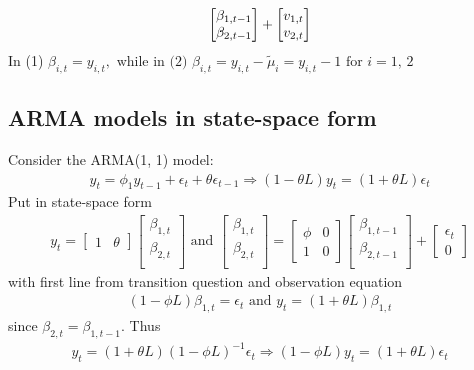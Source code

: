 \documentclass[10pt]{article}
\begin{document}
\begin{itemize}
\begin{gather}
        \begin{bmatrix}
            \beta_{1, t - 1}\\
            \beta_{2, t -1 }\\
        \end{bmatrix}
        +
        \begin{bmatrix}
            v_{1, t}\\
            v_{2, t}\\
        \end{bmatrix}\notag
    \end{gather}
    In (1) $\beta_{i, t} = y_{i, t}, \text{ while in (2) }\beta_{i, t} = y_{i, t} - \tilde{\mu}_i = y_{i, t} - 1 \text{ for }i = 1,\, 2 $
\end{itemize}
\newpage 
\subsection{ARMA models in state-space form}
Consider the ARMA(1, 1) model: 
\begin{gather*}
    y_t = \phi_1y_{t - 1} + \epsilon_t + \theta\epsilon_{t -1 }\Rightarrow (1 - \theta L)y_t = (1 + \theta L)\epsilon_t
\end{gather*}
Put in state-space form 
\begin{gather*}
    y_t = \begin{bmatrix}
        1 & \theta 
    \end{bmatrix}
    \begin{bmatrix}
        \beta_{1, t}\\
        \beta_{2, t}\\
    \end{bmatrix}
    \text{ and }
    \begin{bmatrix}
        \beta_{1, t}\\
        \beta_{2, t}\\
    \end{bmatrix}
    = 
    \begin{bmatrix}
        \phi & 0 \\ 
        1 & 0
    \end{bmatrix}
    \begin{bmatrix}
        \beta_{1, t - 1}\\
        \beta_{2, t -1 }\\
    \end{bmatrix}
    + \begin{bmatrix}
        \epsilon_t \\ 
        0
    \end{bmatrix}
\end{gather*}
with first line from transition question and observation equation 
\begin{gather*}
    (1 - \phi L)\beta_{1, t} = \epsilon_t \text{ and } y_t = (1 + \theta L)\beta_{1, t}
\end{gather*}
since $\beta_{2, t} = \beta_{1, t - 1} $. Thus 
\begin{gather*}
    y_t = (1 + \theta L)(1 - \phi L)^{-1}\epsilon_t \Rightarrow (1 - \phi L)y_t = (1 + \theta L)\epsilon_t
\end{gather*}
\end{document}
